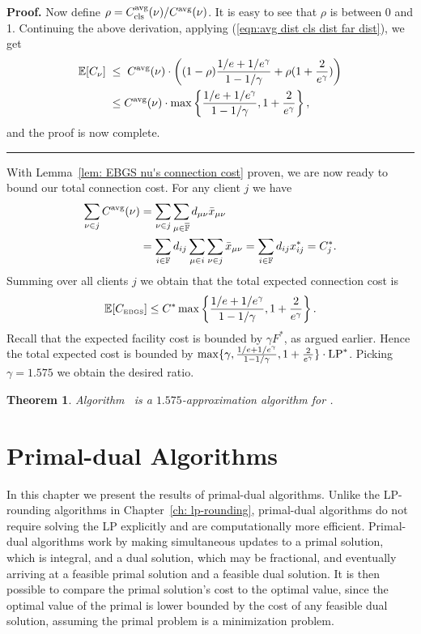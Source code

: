 \documentclass[oneside,final]{ucr}
\newtheorem{theorem}{Theorem}
\newenvironment{proof}[1][Proof]{\textbf{#1.} }{\ \rule{0.5em}{0.5em}}
\begin{document}
\begin{proof}
Now define $\rho =C_{{\mbox{\scriptsize\rm cls}}}^{{\mbox{\scriptsize\rm avg}}}(\nu)/C^{{\mbox{\scriptsize\rm avg}}}(\nu)$. It is easy to
see that $\rho$ is between 0 and 1. Continuing the above
derivation, applying (\ref{eqn:avg dist cls dist far dist}), we get
%
\begin{align*}
\mathbb{E}[C_{\nu}]
             \;&\le\; C^{{\mbox{\scriptsize\rm avg}}}(\nu) 
			\cdot\left((1-\rho)\frac{1/e+1/e^\gamma}{1-1/\gamma} 
				+ \rho (1 + \frac{2}{e^\gamma})\right)
			\\
             &\leq C^{{\mbox{\scriptsize\rm avg}}}(\nu) 
				\cdot \max\left\{\frac{1/e+1/e^\gamma}{1-1/\gamma}, 1 + \frac{2}{e^\gamma}\right\},
\end{align*}
%
and the proof is now complete.
\end{proof}

With Lemma~\ref{lem: EBGS nu's connection cost} proven, we are now ready to bound our total connection cost.
For any client $j$ we have
%
\begin{align*}
\sum_{\nu\in j} C^{{\mbox{\scriptsize\rm avg}}}(\nu)
	&= \sum_{\nu\in j}\sum_{\mu\in\overline{\mathbb{F}}} d_{\mu\nu}{\bar x}_{\mu\nu} 
	\\
	&= \sum_{i\in\mathbb{F}}d_{ij}\sum_{\mu\in i}\sum_{\nu\in j} {\bar x}_{\mu\nu}
	= \sum_{i\in\mathbb{F}} d_{ij}x_{ij}^\ast = C_j^\ast.
\end{align*}
% 
Summing over all clients $j$ we obtain that the total expected connection cost is
%
\begin{equation*}
	\mathbb{E}[ C_{\mbox{\tiny\rm EBGS}} ] \le  C^\ast\max\left\{\frac{1/e+1/e^\gamma}{1-1/\gamma}, 1+\frac{2}{e^\gamma}\right\}.
\end{equation*}
%
Recall that the expected facility cost is bounded by $\gamma F^\ast$,
as argued earlier. Hence the total expected cost is bounded by $\max\{\gamma,
\frac{1/e+1/e^\gamma}{1-1/\gamma}, 1+\frac{2}{e^\gamma}\}\cdot
\mbox{\rm LP}^\ast$. Picking $\gamma=1.575$ we obtain the desired ratio.


\begin{theorem}\label{thm:ebgs}
  Algorithm~{\EBGS} is a $1.575$-approximation algorithm for \FTFP.
\end{theorem}

\chapter{Primal-dual Algorithms} 
\label{ch: primal-dual} 

In this chapter we present the results of primal-dual
algorithms. Unlike the LP-rounding algorithms in
Chapter~\ref{ch: lp-rounding}, primal-dual algorithms do not
require solving the LP explicitly and are computationally
more efficient. Primal-dual algorithms work by making
simultaneous updates to a primal solution, which is
integral, and a dual solution, which may be fractional, and
eventually arriving at a feasible primal solution and a
feasible dual solution. It is then possible to compare the
primal solution's cost to the optimal value, since the
optimal value of the primal is lower bounded by the cost of
any feasible dual solution, assuming the primal problem is a
minimization problem.
\end{document}
